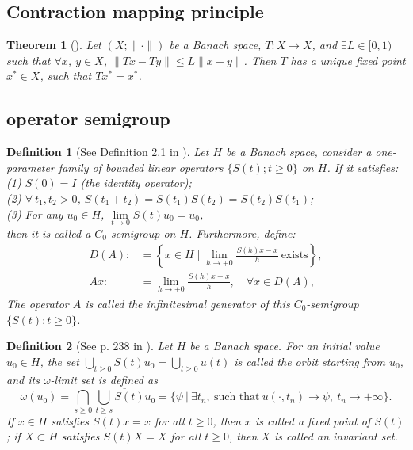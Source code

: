 \documentclass{article}
\numberwithin{equation}{section}
\newtheorem{theorem}{Theorem}[section]
\newtheorem{definition}{Definition}[section]
\begin{document}
\subsection{Contraction mapping principle}

\begin{theorem}[\cite{rud}]
    Let $(X;\|\cdot\|)$ be a Banach space, $T:X\to X$, and $\exists L\in [0, 1)$ such that $\forall x$, $y\in X$, $\|Tx-Ty\|\le L\|x-y\|$. Then $T$ has a unique fixed point $x^{*}\in X$, such that $Tx^{*}=x^{*}$.
\end{theorem}

\subsection{operator semigroup}

\begin{definition}[See Definition 2.1 in \cite{ref18}]
Let $H$ be a Banach space, consider a one-parameter family of bounded linear operators $\{S(t) ; t \geq 0\}$ on $H$. If it satisfies:
\\(1) $S(0)=I$ (the identity operator);
\\(2) $\forall\ t_1,t_2>0$, $S(t_1+t_2)=S(t_1)S(t_2)=S(t_2)S(t_1)$;
\\(3) For any $u_{0} \in H$, $\lim\limits_{t\to 0}S(t) u_{0} =u_0$,
\\then it is called a $C_0$-semigroup on $H$. Furthermore, define:
$$
\begin{aligned}
D(A):&=\left\{x \in H \mid \lim _{h \rightarrow+0} \frac{S(h) x-x}{h}\ \text{exists} \right\}, \\
A x:&=\lim _{h \rightarrow+0} \frac{S(h) x-x}{h} ,\quad \forall x \in D(A),
\end{aligned}
$$
The operator $A$ is called the infinitesimal generator of this $C_0$-semigroup $\{S(t) ; t \geq 0\}$.
\end{definition}

\begin{definition}[See p. 238 in \cite{ref8}]
    Let $H$ be a Banach space. For an initial value $u_0\in H$, the set $\bigcup_{t\ge 0}S(t)u_0=\bigcup_{t\ge 0}u(t)$ is called the orbit starting from $u_0$, and its $\omega$-limit set is defined as
    $$\omega(u_0)=\bigcap_{s\ge 0}\overline{\bigcup_{t\ge s}S(t)u_0}=\{\psi\ |\ \exists t_n,\ \text{such that}\  u(\cdot,t_n)\to \psi,\ t_n\to +\infty\}.$$
    If $x\in H$ satisfies $S(t)x=x$ for all $t\ge 0$, then $x$ is called a fixed point of $S(t)$; if $X\subset H$ satisfies $S(t)X=X$ for all $t\ge 0$, then $X$ is called an invariant set.
\end{definition}
\end{document}
